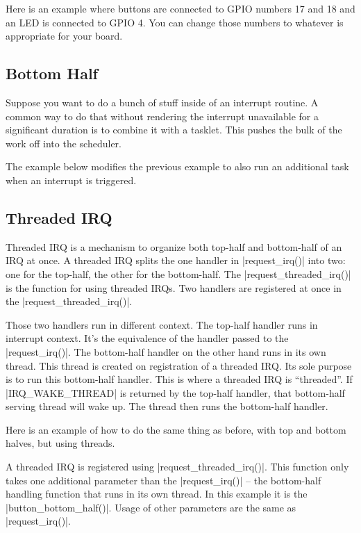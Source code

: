 \documentclass[10pt, oneside]{book}
\begin{document}
Here is an example where buttons are connected to GPIO numbers 17 and 18 and an LED is connected to GPIO 4.
You can change those numbers to whatever is appropriate for your board.


\subsection{Bottom Half}
\label{sec:bottom_half}
Suppose you want to do a bunch of stuff inside of an interrupt routine.
A common way to do that without rendering the interrupt unavailable for a significant duration is to combine it with a tasklet.
This pushes the bulk of the work off into the scheduler.

The example below modifies the previous example to also run an additional task when an interrupt is triggered.


\subsection{Threaded IRQ}
\label{sec:threaded_irq}
Threaded IRQ is a mechanism to organize both top-half and bottom-half of an IRQ at once.
A threaded IRQ splits the one handler in \cpp|request_irq()| into two: one for the top-half, the other for the bottom-half.
The \cpp|request_threaded_irq()| is the function for using threaded IRQs.
Two handlers are registered at once in the \cpp|request_threaded_irq()|.

Those two handlers run in different context.
The top-half handler runs in interrupt context.
It's the equivalence of the handler passed to the \cpp|request_irq()|.
The bottom-half handler on the other hand runs in its own thread.
This thread is created on registration of a threaded IRQ.
Its sole purpose is to run this bottom-half handler.
This is where a threaded IRQ is ``threaded''.
If \cpp|IRQ_WAKE_THREAD| is returned by the top-half handler, that bottom-half serving thread will wake up.
The thread then runs the bottom-half handler.

Here is an example of how to do the same thing as before, with top and bottom halves, but using threads.


A threaded IRQ is registered using \cpp|request_threaded_irq()|.
This function only takes one additional parameter than the \cpp|request_irq()| -- the bottom-half handling function that runs in its own thread.
In this example it is the \cpp|button_bottom_half()|.
Usage of other parameters are the same as \cpp|request_irq()|.
\end{document}
